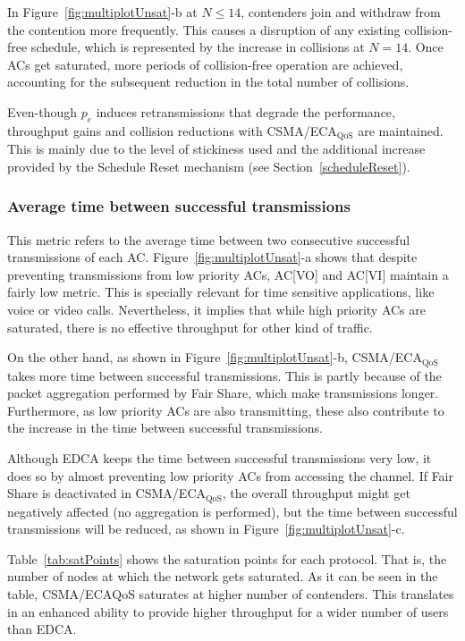 \begin{itemize}
In Figure~\ref{fig:multiplotUnsat}-b at $N\leq 14$, contenders join and withdraw from the contention more frequently. This causes a disruption of any existing collision-free schedule, which is represented by the increase in collisions at $N=14$. Once ACs get saturated, more periods of collision-free operation are achieved, accounting for the subsequent reduction in the total number of collisions.

Even-though $p_e$ induces retransmissions that degrade the performance, throughput gains and collision reductions with CSMA/ECA$_{\text{QoS}}$ are maintained. This is mainly due to the level of stickiness used and the additional increase provided by the Schedule Reset mechanism (see Section~\ref{scheduleReset}).

\end{itemize}

\subsubsection{Average time between successful transmissions}
This metric refers to the average time between two consecutive successful transmissions of each AC. Figure~\ref{fig:multiplotUnsat}-a shows that despite preventing transmissions from low priority ACs, AC[VO] and AC[VI] maintain a fairly low metric. This is specially relevant for time sensitive applications, like voice or video calls. Nevertheless, it implies that while high priority ACs are saturated, there is no effective throughput for other kind of traffic.

On the other hand, as shown in Figure~\ref{fig:multiplotUnsat}-b, CSMA/ECA$_{\text{QoS}}$ takes more time between successful transmissions. This is partly because of the packet aggregation performed by Fair Share, which make transmissions longer. Furthermore, as low priority ACs are also transmitting, these also contribute to the increase in the time between successful transmissions. 

Although EDCA keeps the time between successful transmissions very low, it does so by almost preventing low priority ACs from accessing the channel. If Fair Share is deactivated in CSMA/ECA$_{\text{QoS}}$, the overall throughput might get negatively affected (no aggregation is performed), but the time between successful transmissions will be reduced, as shown in Figure~\ref{fig:multiplotUnsat}-c.

Table~\ref{tab:satPoints} shows the saturation points for each protocol. That is, the number of nodes at which the network gets saturated. As it can be seen in the table, CSMA/ECA${\text{QoS}}$ saturates at higher number of contenders. This translates in an enhanced ability to provide higher throughput for a wider number of users than EDCA.

